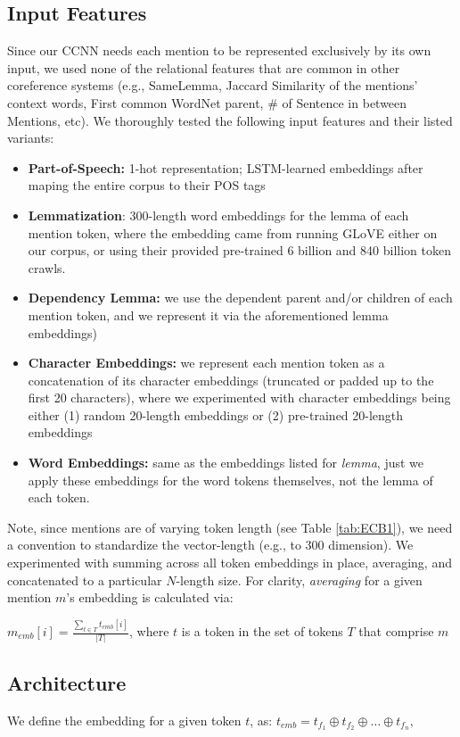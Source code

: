 \documentclass[11pt,a4paper]{article}
\begin{document}
\subsection{Input Features}
Since our CCNN needs each mention to be represented exclusively by its own input, we used none of the relational features that are common in other coreference systems (e.g., SameLemma, Jaccard Similarity of the mentions' context words, First common WordNet parent, \# of Sentence in between Mentions, etc).  We thoroughly tested the following input features and their listed variants:
\begin{itemize}
  \item \textbf{Part-of-Speech:} 1-hot representation; LSTM-learned embeddings after maping the entire corpus to their POS tags
  \item \textbf{Lemmatization}: 300-length word embeddings for the lemma of each mention token, where the embedding came from running GLoVE \cite{pennington2014glove} either on our corpus, or using their provided pre-trained 6 billion and 840 billion token crawls.
  \item \textbf{Dependency Lemma:} we use the dependent parent and/or children of each mention token, and we represent it via the aforementioned lemma embeddings)
  \item \textbf{Character Embeddings:} we represent each mention token as a concatenation of its character embeddings (truncated or padded up to the first 20 characters), where we experimented with character embeddings being either (1) random 20-length embeddings or (2) pre-trained 20-length embeddings
  \item \textbf{Word Embeddings:} same as the embeddings listed for \textit{lemma}, just we apply these embeddings for the word tokens themselves, not the lemma of each token.
\end{itemize}
Note, since mentions are of varying token length (see Table \ref{tab:ECB1}), we need a convention to standardize the vector-length (e.g., to 300 dimension).  We experimented with summing across all token embeddings in place, averaging, and concatenated to a particular $N$-length size.  For clarity, \textit{averaging} for a given mention $m$'s embedding is calculated via:

$m_{emb}[i] = \frac{\sum_{t \in T}t_{emb}[i]}{|T|}$, where $t$ is a token in the set of tokens $T$ that comprise $m$

\subsection{Architecture}
We define the embedding for a given token $t$, as: $t_{emb} = t_{f_{1}} \oplus t_{f_{2}} \oplus \ldots \oplus t_{f_{n}},$
\end{document}

